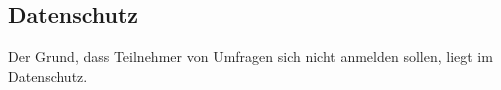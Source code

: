 \subsection{Datenschutz}
Der Grund, dass Teilnehmer von Umfragen sich nicht anmelden sollen, liegt im Datenschutz.





